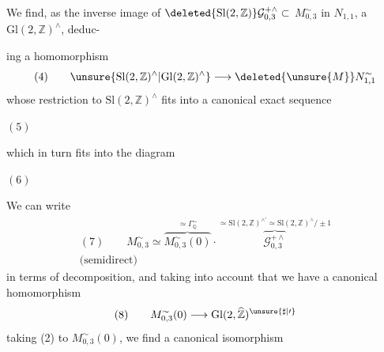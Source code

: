 We find,   as the inverse image of $\deleted{\mathrm{Sl}(2,\mathbb Z)}\mathcal G_{0,3}^{+\wedge}\subset$  $M_{0,3}^{\sim}$ in $N_{1,1}$, a $\mathrm{Gl}(2,\mathbb Z)^\wedge$, deduc-



ing a homomorphism
\[
(4)\qquad
\unsure{\mathrm{Sl}(2,\mathbb Z)^\wedge|\mathrm{Gl}(2,\mathbb Z)^\wedge}
\longrightarrow\deleted{\unsure{M}}N_{1,1}^{\sim}
\]
whose restriction to $\mathrm{Sl}(2,\mathbb Z)^\wedge$ fits  into a canonical exact sequence

$(5)$

which in turn fits into the diagram

$(6)$

We can write
\[
\begin{gathered}
(7)\qquad M_{0,3}^{\sim}\simeq
\overbrace{M_{0,3}^{\sim}(0)}^{\simeq\Gamma_{\mathbb Q}^{\sim}}
\cdot\overbrace{\mathcal G_{0,3}^{+\wedge}}^{\simeq\mathrm{Sl}(2,\mathbb Z)^{\wedge\prime}\simeq\mathrm{Sl}(2,\mathbb Z)^\wedge/\pm1}\\
\text{(semidirect)}
\end{gathered}
\]
in terms of  decomposition, and taking into account that we have a canonical homomorphism
\[
(8)\qquad M_{0,3}^{\sim}(0)\longrightarrow\mathrm{Gl}(2,\widehat{\mathbb Z})^{\unsure{\sharp|\prime}}
\]
 taking    (2) to $M_{0,3}^{\sim}(0)$, we find a canonical isomorphism

